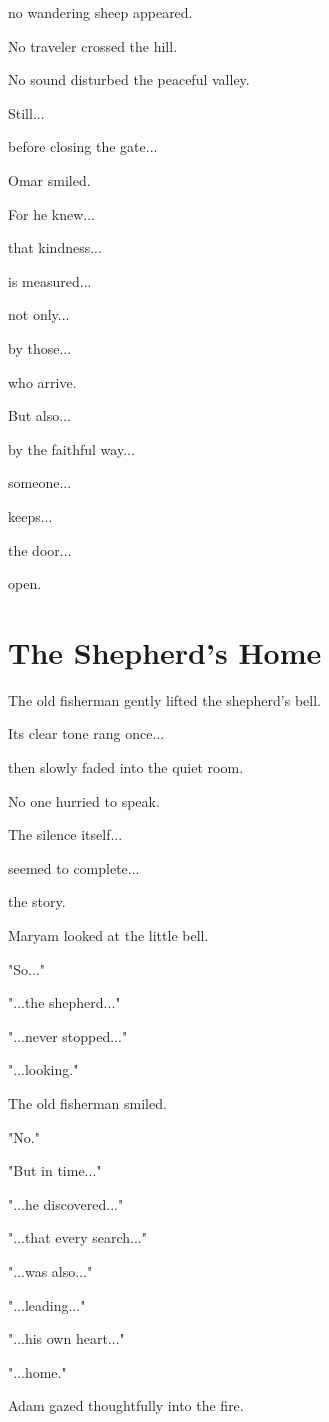\documentclass[12pt,openany]{book}
\begin{document}
no wandering sheep appeared.

No traveler crossed the hill.

No sound disturbed the peaceful valley.

Still...

before closing the gate...

Omar smiled.

For he knew...

that kindness...

is measured...

not only...

by those...

who arrive.

But also...

by the faithful way...

someone...

keeps...

the door...

open.
\section*{The Shepherd's Home}

The old fisherman gently lifted the shepherd's bell.

Its clear tone rang once...

then slowly faded into the quiet room.

No one hurried to speak.

The silence itself...

seemed to complete...

the story.

Maryam looked at the little bell.

"So..."

"...the shepherd..."

"...never stopped..."

"...looking."

The old fisherman smiled.

"No."

"But in time..."

"...he discovered..."

"...that every search..."

"...was also..."

"...leading..."

"...his own heart..."

"...home."

Adam gazed thoughtfully into the fire.
\end{document}

